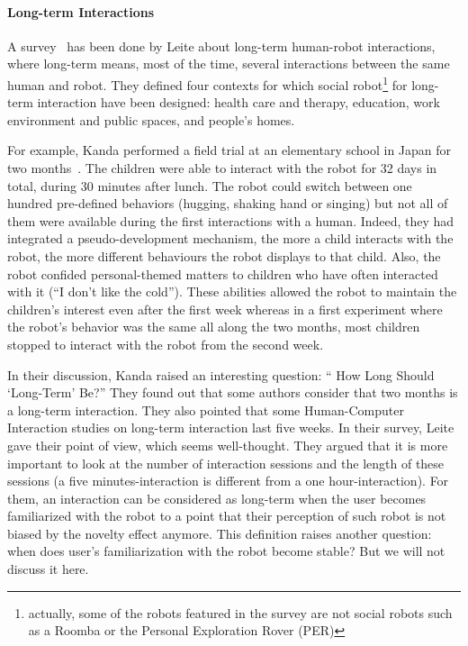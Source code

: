 \documentclass[a4paper,11pt,twoside]{StyleThese}
\begin{document}
\paragraph{Long-term Interactions}
A survey~\cite{leite_2013_social} has been done by Leite \etal{} about long-term human-robot interactions, where long-term means, most of the time, several interactions between the same human and robot. They defined four contexts for which social robot\footnote{actually, some of the robots featured in the survey are not social robots such as a Roomba or the Personal Exploration Rover (PER)} for long-term interaction have been designed: health care and therapy, education, work environment and public spaces, and people's homes. 

For example, Kanda \etal{} performed a field trial at an elementary school in Japan for two months~\cite{kanda_2007_two}. The children were able to interact with the robot for 32 days in total, during 30 minutes after lunch. The robot could switch between one hundred pre-defined behaviors (\eg hugging, shaking hand or singing) but not all of them were available during the first interactions with a human. Indeed, they had integrated a pseudo-development mechanism, \ie the more a child interacts with the robot, the more different behaviours the robot displays to that child. Also, the robot confided personal-themed matters to children who have often interacted with it (\eg ``I don't like the cold''). These abilities allowed the robot to maintain the children's interest even after the first week whereas in a first experiment where the robot's behavior was the same all along the two months, most children stopped to interact with the robot from the second week. 

In their discussion, Kanda \etal{} raised an interesting question: `` How Long Should \textquoteleft Long-Term\textquoteright{} Be?'' They found out that some authors consider that two months is a long-term interaction. They also pointed that some Human-Computer Interaction studies on long-term interaction last five weeks. In their survey, Leite \etal{} gave their point of view, which seems well-thought. They argued that it is more important to look at the number of interaction sessions and the length of these sessions (a five minutes-interaction is different from a one hour-interaction). For them, an interaction can be considered as long-term when the user becomes familiarized with the robot to a point that their perception of such robot is not biased by the novelty effect anymore. This definition raises another question: when does user’s familiarization with the robot become stable? But we will not discuss it here.
\end{document}
